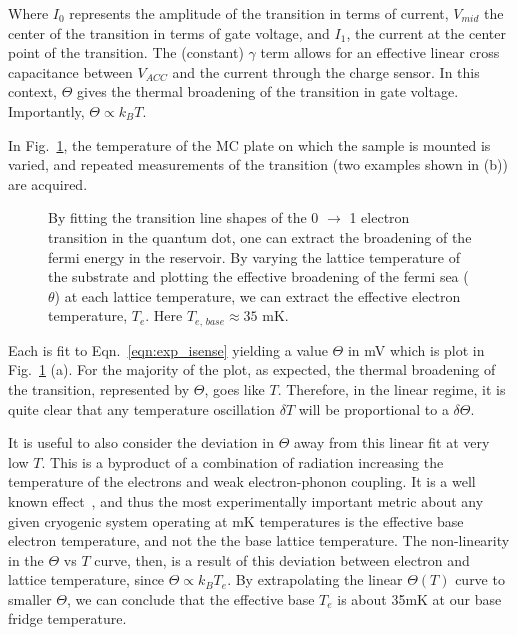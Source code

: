 Where $I_0$ represents the amplitude of the transition in terms of current, $V_{mid}$ the center of the transition in terms of gate voltage, and $I_1$, the current at the center point of the transition. The (constant) $\gamma$ term allows for an effective linear cross capacitance between $V_{ACC}$ and the current through the charge sensor. In this context, $\Theta$ gives the thermal broadening of the transition in gate voltage. Importantly, $\Theta \propto k_B T$. 

In Fig.~\ref{fig:etemp}, the temperature of the \ac{MC} plate on which the sample is mounted is varied, and repeated measurements of the transition (two examples shown in (b)) are acquired. 
\begin{figure}[h]
\centering
{}
\caption{By fitting the transition line shapes of the 0 $\to$ 1 electron transition in the quantum dot, one can extract the broadening of the fermi energy in the reservoir. By varying the lattice temperature of the substrate and plotting the effective broadening of the fermi sea ($\theta$) at each lattice temperature, we can extract the effective electron temperature, $T_e$. Here $T_{e, \, base} \approx 35$ mK.}
\label{fig:etemp}       
\end{figure}
Each is fit to Eqn.~\ref{eqn:exp_isense} yielding a value $\Theta$ in mV which is plot in Fig.~\ref{fig:etemp} (a). For the majority of the plot, as expected, the thermal broadening of the transition, represented by $\Theta$, goes like $T$. Therefore, in the linear regime, it is quite clear that any temperature oscillation $\delta T$ will be proportional to a $\delta \Theta$. 

It is useful to also consider the deviation in $\Theta$ away from this linear fit at very low $T$. This is a byproduct of a combination of radiation increasing the temperature of the electrons and weak electron-phonon coupling. It is a well known effect~\cite{PhysRevB.49.5942}, and thus the most experimentally important metric about any given cryogenic system operating at mK temperatures is the effective base electron temperature, and not the the base lattice temperature. The non-linearity in the $\Theta$ vs $T$ curve, then, is a result of this deviation between electron and lattice temperature, since $\Theta \propto k_B T_e$. By extrapolating the linear $\Theta (T)$ curve to smaller $\Theta$, we can conclude that the effective base $T_e$ is about 35mK at our base fridge temperature.

